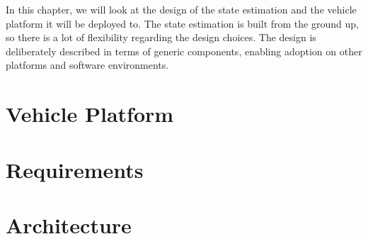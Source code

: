 In this chapter, we will look at the design of the state estimation and the vehicle platform it will be deployed to. The state estimation is built from the ground up, so there is a lot of flexibility regarding the design choices. The design is deliberately described in terms of generic components, enabling adoption on other platforms and software environments.

\section{Vehicle Platform}


\section{Requirements}


\section{Architecture}

